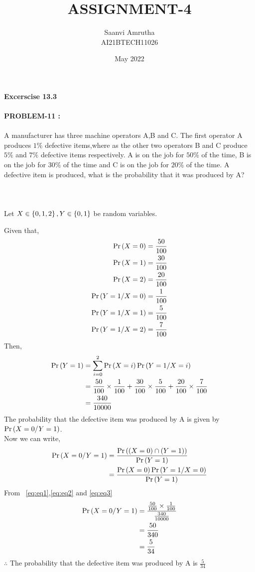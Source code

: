 \documentclass[journal,13pt,twocolumn]{IEEEtran}
\begin{document}
\title{ASSIGNMENT-4} 
\author{Saanvi Amrutha\\AI21BTECH11026} 
\date{May 2022}     
\maketitle
\newpage
\bigskip
\textbf{Excerscise 13.3 \\\\PROBLEM-11 :}\\\\
\text A manufacturer has three machine operators A,B and C. The first operator A produces $1\%$ defective items,where as the other two operators B and C produce $5\%$ and $7\%$ defective items respectively. A is on the job for $50\%$ of the time, B is on the job for $30\%$ of the time and C is on the job for $20\%$ of the time. A defective item is produced, what is the probability that it was produced by A?\\\\
\solution \\\\
Let $X\in\left\{0,1,2\right\},Y\in\left\{0,1\right\}$ be random variables.\\
\begin{table}[h]
\begin{center}
    
	\vspace{5pt}
\caption{}
\label{table:table1}
\end{center}
\end{table}

Given that,
\begin{align}
\Pr\left(X=0\right)&=\frac{50}{100}\label{eq:eq1}\\
\Pr\left(X=1\right)&=\frac{30}{100}\\
\Pr\left(X=2\right)&=\frac{20}{100}\\
\Pr\left(Y=1/X=0\right)&=\frac{1}{100}\label{eq:eq2}\\
\Pr\left(Y=1/X=1\right)&=\frac{5}{100}\\
\Pr\left(Y=1/X=2\right)&=\frac{7}{100}
\end{align}
Then,
\begin{align}
\Pr\left(Y=1\right)&=\sum_{i=0}^{2}\Pr\left(X=i\right)\Pr\left(Y=1/X=i\right)\\
&=\frac{50}{100}\times\frac{1}{100}+\frac{30}{100}\times\frac{5}{100}+\frac{20}{100}\times\frac{7}{100}\\
&=\frac{340}{10000}\label{eq:eq3}
\end{align}
The probability that the defective item was produced by A is given by $\Pr\left(X=0/Y=1\right)$.\\
Now we can write,
\begin{align}
\Pr\left(X=0/Y=1\right)&=\frac{\Pr\left(\left(X=0\right)\cap\left(Y=1\right)\right)}{\Pr\left(Y=1\right)}\\
&=\frac{\Pr\left(X=0\right)\Pr\left(Y=1/X=0\right)}{\Pr\left(Y=1\right)}
\end{align}
From ~\eqref{eq:eq1},\eqref{eq:eq2} and \eqref{eq:eq3} 
\begin{align}
\Pr\left(X=0/Y=1\right)&=\frac{\frac{50}{100}\times\frac{1}{100}}{\frac{340}{10000}}\\
&=\frac{50}{340}\\
&=\frac{5}{34}
\end{align}
$\therefore$ The probability that the defective item was produced by A is $\frac{5}{34}$
\end{document}
